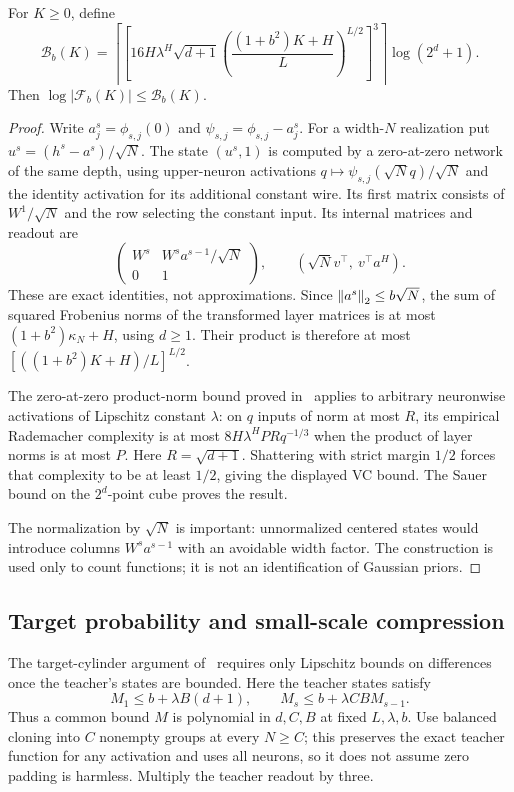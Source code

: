\begin{lemma}\label{lem:offset-capacity}
For $K\ge0$, define
\[
 \mathcal B_b(K)=
 \left\lceil\left[
 16H\lambda^H\sqrt{d+1}
 \left(\frac{(1+b^2)K+H}{L}\right)^{L/2}
 \right]^3\right\rceil\log(2^d+1).
\]
Then $\log|\mathcal F_b(K)|\le\mathcal B_b(K)$.
\end{lemma}
\begin{proof}
Write $a^s_j=\phi_{s,j}(0)$ and
$\psi_{s,j}=\phi_{s,j}-a^s_j$. For a width-$N$ realization put
$u^s=(h^s-a^s)/\sqrt N$. The state $(u^s,1)$ is computed by a
zero-at-zero network of the same depth, using upper-neuron activations
$q\mapsto\psi_{s,j}(\sqrt Nq)/\sqrt N$ and the identity activation for
its additional constant wire. Its first matrix consists of $W^1/\sqrt N$
and the row selecting the constant input. Its internal matrices and
readout are
\[
 \begin{pmatrix}W^s&W^sa^{s-1}/\sqrt N\\0&1\end{pmatrix},
 \qquad (\sqrt Nv^\top,\ v^\top a^H).
\]
These are exact identities, not approximations. Since
$\left\lVert a^s\right\rVert_2\le b\sqrt N$, the sum of squared Frobenius norms of the
transformed layer matrices is at most $(1+b^2)\kappa_N+H$, using $d\ge1$.
Their product is therefore at most
$[((1+b^2)K+H)/L]^{L/2}$.

The zero-at-zero product-norm bound proved in~\cite{lipschitz} applies to
arbitrary neuronwise activations of Lipschitz constant $\lambda$:
on $q$ inputs of norm at most $R$, its empirical Rademacher complexity is
at most $8H\lambda^HPRq^{-1/3}$ when the product of layer norms is at
most $P$. Here $R=\sqrt{d+1}$. Shattering with strict margin $1/2$
forces that complexity to be at least $1/2$, giving the displayed VC bound.
The Sauer bound on the $2^d$-point cube proves the result.

The normalization by $\sqrt N$ is important: unnormalized centered
states would introduce columns $W^sa^{s-1}$ with an avoidable width
factor. The construction is used only to count functions; it is not an
identification of Gaussian priors.
\end{proof}

\subsection{Target probability and small-scale compression}
The target-cylinder argument of~\cite{lipschitz} requires only Lipschitz
bounds on differences once the teacher's states are bounded. Here the
teacher states satisfy
\[
 M_1\le b+\lambda B(d+1),\qquad
 M_s\le b+\lambda CBM_{s-1}.
\]
Thus a common bound $M$ is polynomial in $d,C,B$ at fixed $L,\lambda,b$.
Use balanced cloning into $C$ nonempty groups at every $N\ge C$;
this preserves the exact teacher function for any activation and uses
all neurons, so it does not assume zero padding is harmless.
Multiply the teacher readout by three.

